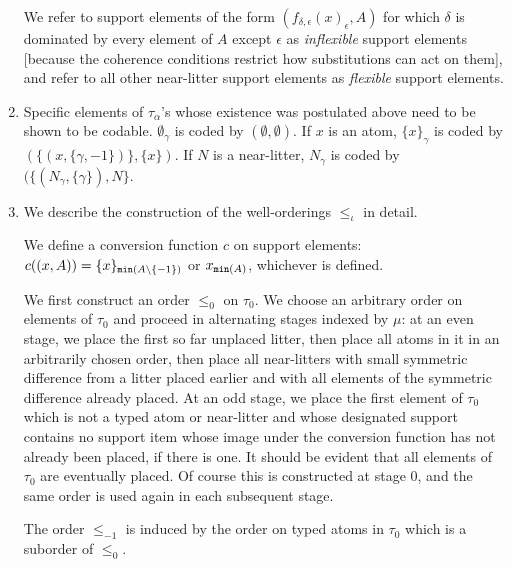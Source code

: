 \documentclass[12pt]{article}
\begin{document}
\begin{enumerate}
We refer to support elements of the form $(f_{\delta,\epsilon}(x)_\epsilon,A)$ for which $\delta$ is dominated by every element of $A$ except $\epsilon$ as {\em inflexible\/} support elements [because the coherence conditions restrict how substitutions can act on them], and refer to all other near-litter support elements as {\em flexible\/} support elements.

\item Specific elements of $\tau_\alpha$'s whose existence was postulated above need to be shown to be codable.  $\emptyset_\gamma$ is coded by $(\emptyset,\emptyset)$.  If $x$ is an atom, $\{x\}_\gamma$ is coded by $(\{(x,\{\gamma,-1\})\},\{x\})$.  If $N$ is a near-litter,
$N_\gamma$ is coded by $(\{(N_\gamma,\{\gamma\}),N\}$.

\item  We describe the construction of the well-orderings $\leq_\iota$ in detail.

We define a conversion function $c$ on support elements:  $c((x,A)) = \{x\}_{{\tt min}(A\setminus \{-1\})}$ or $x_{{\tt min}(A)}$, whichever is defined.

We first construct an order $\leq_0$  on $\tau_0$.  We choose an arbitrary order on elements of $\tau_0$ and proceed in alternating stages indexed by $\mu$:  at an even stage, we place the first so far unplaced litter, then place all atoms in it in an arbitrarily chosen order, then place all near-litters with small symmetric difference from a litter placed earlier and with all elements of the symmetric difference already placed.  At an odd stage, we place the first element of $\tau_0$ which is not a typed atom or near-litter and whose designated support contains no support item whose image under the conversion function has not already been placed, if there is one.  It should be evident that all elements of $\tau_0$ are eventually placed.  Of course this is constructed
at stage 0, and the same order is used again in each subsequent stage.

The order $\leq_{-1}$
is induced by the order on typed atoms in $\tau_0$ which is a suborder of $\leq_0$.




\end{enumerate}
\end{document}

